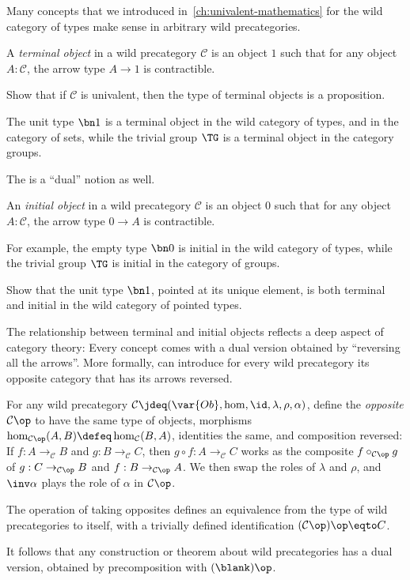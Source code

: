 Many concepts that we introduced in~\cref{ch:univalent-mathematics}
for the wild category of types make sense in arbitrary wild precategories.

\begin{definition}\label{def:terminal-obj}
  A \emph{terminal object}
  in a wild precategory $\mathcal C$ is an object $1$
  such that for any object $A:\mathcal C$,
  the arrow type $A \to 1$ is contractible.
\end{definition}
\begin{xca}\label{xca:terminal-prop}
  Show that if $\mathcal C$ is univalent, then
  the type of terminal objects is a proposition.
\end{xca}
The unit type $\bn 1$ is a terminal object in the wild category of types,
and in the category of sets,
while the trivial group $\TG$ is a terminal object in the category groups.

The is a ``dual'' notion as well.
\begin{definition}\label{def:initial-obj}
  An \emph{initial object}
  in a wild precategory $\mathcal C$ is an object $0$
  such that for any object $A:\mathcal C$,
  the arrow type $0\to A$ is contractible.
\end{definition}
For example, the empty type $\bn 0$ is initial in the wild category of types,
while the trivial group $\TG$ is initial in the category of groups.

\begin{xca}\label{xca:unit-ptd-types}
  Show that the unit type $\bn 1$, pointed at its unique element,
  is both terminal and initial in the wild category of pointed types.
\end{xca}

The relationship between terminal and initial objects reflects
a deep aspect of category theory: Every concept comes with a dual version
obtained by ``reversing all the arrows''.
More formally, can introduce for every wild precategory its opposite category
that has its arrows reversed.
\begin{definition}\label{def:op-cat}
  For any wild precategory $\mathcal C\jdeq(\var{Ob},\hom,\id,\lambda,\rho,\alpha)$,
  define the \emph{opposite} $\mathcal C\op$
  to have the same type of objects,
  morphisms $\hom_{\mathcal C\op}(A,B) \defeq \hom_{\mathcal C}(B,A)$,
  identities the same, and composition reversed:
  If $f : A \to_{\mathcal C} B$ and $g : B \to_{\mathcal C} C$,
  then $g\circ f : A \to_{\mathcal C} C$ works
  as the composite $f \circ_{\mathcal C\op} g$ of $g : C \to_{\mathcal C\op} B$
  and $f : B \to_{\mathcal C\op} A$.
  We then swap the roles of $\lambda$ and $\rho$,
  and $\inv\alpha$ plays the role of $\alpha$ in $\mathcal C\op$.
\end{definition}
\begin{lemma}\label{lem:op-idem}
  The operation of taking opposites defines an equivalence
  from the type of wild precategories to itself,
  with a trivially defined identification $(\mathcal C\op)\op \eqto C$.
\end{lemma}
It follows that any construction or theorem about wild precategories
has a dual version, obtained by precomposition with $(\blank)\op$.


